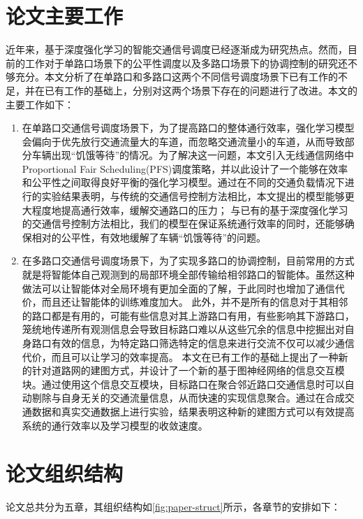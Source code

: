 \section{论文主要工作}
近年来，基于深度强化学习的智能交通信号调度已经逐渐成为研究热点。然而，目前的工作对于单路口场景下的公平性调度以及多路口场景下的协调控制的研究还不够充分。本文分析了在单路口和多路口这两个不同信号调度场景下已有工作的不足，并在已有工作的基础上，分别对这两个场景下存在的问题进行了改进。本文的主要工作如下：
\begin{enumerate}
    \item 在单路口交通信号调度场景下，为了提高路口的整体通行效率，强化学习模型会偏向于优先放行交通流量大的车道，而忽略交通流量小的车道，从而导致部分车辆出现“饥饿等待”的情况。为了解决这一问题，本文引入无线通信网络中Proportional Fair Scheduling(PFS)调度策略，并以此设计了一个能够在效率和公平性之间取得良好平衡的强化学习模型。通过在不同的交通负载情况下进行的实验结果表明，与传统的交通信号控制方法相比，本文提出的模型能够更大程度地提高通行效率，缓解交通路口的压力；
    与已有的基于深度强化学习的交通信号控制方法相比，我们的模型在保证系统通行效率的同时，还能够确保相对的公平性，有效地缓解了车辆“饥饿等待”的问题。
    \item 在多路口交通信号调度场景下，为了实现多路口的协调控制，目前常用的方式就是将智能体自己观测到的局部环境全部传输给相邻路口的智能体。虽然这种做法可以让智能体对全局环境有更加全面的了解，于此同时也增加了通信代价，而且还让智能体的训练难度加大。
    此外，并不是所有的信息对于其相邻的路口都是有用的，可能有些信息对其上游路口有用，有些影响其下游路口，笼统地传递所有观测信息会导致目标路口难以从这些冗余的信息中挖掘出对自身路口有效的信息，为特定路口筛选特定的信息来进行交流不仅可以减少通信代价，而且可以让学习的效率提高。
    本文在已有工作的基础上提出了一种新的针对道路网的建图方式，并设计了一个新的基于图神经网络的信息交互模块。通过使用这个信息交互模块，目标路口在聚合邻近路口交通信息时可以自动剔除与自身无关的交通流量信息，从而快速的实现信息聚合。通过在合成交通数据和真实交通数据上进行实验，结果表明这种新的建图方式可以有效提高系统的通行效率以及学习模型的收敛速度。
\end{enumerate}
\section{论文组织结构}
论文总共分为五章，其组织结构如\autoref{fig:paper-struct}所示，各章节的安排如下：

